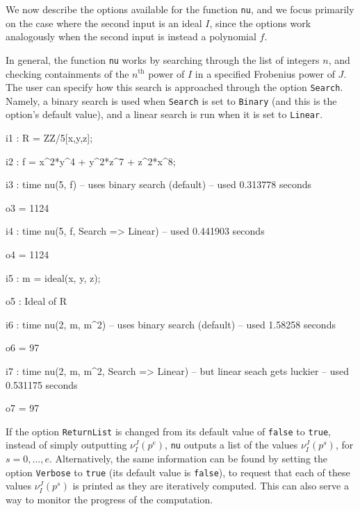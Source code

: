 \documentclass{amsart}
\begin{document}

We now describe the options available for the function {\tt nu}, and we focus primarily on the case where the second input is an ideal $I$, since the options work analogously when the second input is instead a polynomial $f$. 

In general, the function {\tt nu} works by searching through the list of integers $n$, and checking containments of the $n^\text{th}$ power of $I$ in a specified Frobenius power of $J$.  
The user can specify how this search is approached through the  option {\tt Search}.  Namely, a binary search is used when {\tt Search} is set to {\tt Binary} (and this is the option's default value), and a linear search is run when it is set to {\tt Linear}.

{\small
{}
\begin{MyVerbatim}

i1 : R = ZZ/5[x,y,z];

i2 : f = x^2*y^4 + y^2*z^7 + z^2*x^8;

i3 : time nu(5, f) -- uses binary search (default)
     -- used 0.313778 seconds

o3 = 1124

i4 : time nu(5, f, Search => Linear)
     -- used 0.441903 seconds

o4 = 1124

i5 : m = ideal(x, y, z);

o5 : Ideal of R

i6 : time nu(2, m, m^2) -- uses binary search (default)
     -- used 1.58258 seconds

o6 = 97

i7 : time nu(2, m, m^2, Search => Linear) -- but linear seach gets luckier
     -- used 0.531175 seconds

o7 = 97
\end{MyVerbatim}
}
\medspace



If the option {\tt ReturnList} is changed from its default value of {\tt false} to {\tt true}, instead of simply outputting $\nu_I^J(p^e)$, {\tt nu} outputs a list of the values $\nu_I^J(p^s)$, for $s=0,\ldots,e$.
Alternatively, the same information can be found by setting the option {\tt Verbose} to {\tt true} (its default value is {\tt false}), to request that each of these values $\nu_I^J(p^s)$ is printed as they are iteratively computed.  This can also serve a way to monitor the progress of the computation.
\end{document}
